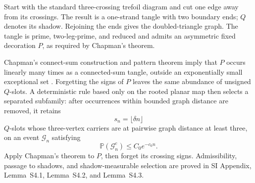 \documentclass[9pt,twoside]{pnas-new}
\theoremstyle{definition}
\theoremstyle{remark}
\renewcommand{\Pr}{\mathbb{P}}
\newcommand{\SILocation}[1]{SI Appendix, #1}
\newcommand{\SIOpenedTrefoilAdmissibility}{Lemma~S4.1}
\newcommand{\SIShadowTransfer}{Lemma~S4.2}
\newcommand{\SIShadowSelection}{Lemma~S4.3}
\begin{document}
Start with the standard three-crossing trefoil diagram and cut one edge away from its crossings.  The result is a one-strand tangle with two boundary ends; $Q$ denotes its shadow.  Rejoining the ends gives the doubled-triangle graph.  The tangle is prime, two-leg-prime, and reduced and admits an asymmetric fixed decoration $P$, as required by Chapman's theorem.

Chapman's connect-sum construction and pattern theorem imply that $P$ occurs linearly many times as a connected-sum tangle, outside an exponentially small exceptional set \cite[Propositions 3 and 10]{chapman2017}.  Forgetting the signs of $P$ leaves the same abundance of unsigned $Q$-slots.  A deterministic rule based only on the rooted planar map then selects a separated subfamily: after occurrences within bounded graph distance are removed, it retains
\[
 s_n=\lfloor\delta n\rfloor
\]
$Q$-slots whose three-vertex carriers are at pairwise graph distance at least three, on an event $\mathcal G_n$ satisfying
\[
 \Pr(\mathcal G_n^c)\le C_0e^{-c_0n}.
\]
Apply Chapman's theorem to $P$, then forget its crossing signs. Admissibility, passage to shadows, and shadow-measurable selection are proved in \SILocation{\SIOpenedTrefoilAdmissibility{}, \SIShadowTransfer{}, and \SIShadowSelection{}}.
\end{document}

